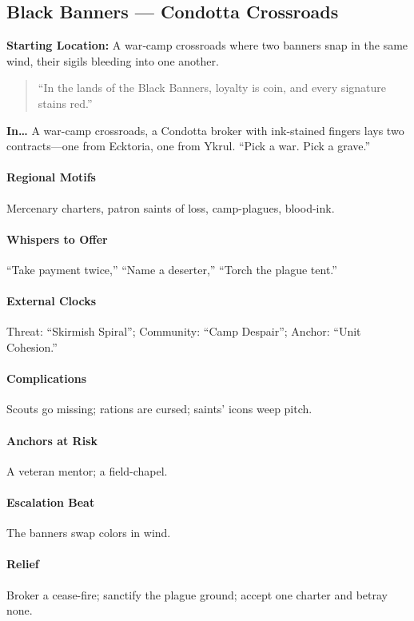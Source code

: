 \subsection*{Black Banners — Condotta Crossroads}
\textbf{Starting Location:} A war‑camp crossroads where two banners snap in the same wind, their sigils bleeding into one another.
\begin{quote}
“In the lands of the Black Banners, loyalty is coin, and every signature stains red.”
\end{quote}

\textbf{In…} A war-camp crossroads, a Condotta broker with ink-stained fingers lays two contracts—one from Ecktoria, one from Ykrul. ``Pick a war. Pick a grave.''
\paragraph{Regional Motifs} Mercenary charters, patron saints of loss, camp-plagues, blood-ink.
\paragraph{Whispers to Offer} ``Take payment twice,'' ``Name a deserter,'' ``Torch the plague tent.''
\paragraph{External Clocks} Threat: ``Skirmish Spiral''; Community: ``Camp Despair''; Anchor: ``Unit Cohesion.''
\paragraph{Complications} Scouts go missing; rations are cursed; saints’ icons weep pitch.
\paragraph{Anchors at Risk} A veteran mentor; a field-chapel.
\paragraph{Escalation Beat} The banners swap colors in wind.
\paragraph{Relief} Broker a cease-fire; sanctify the plague ground; accept one charter and betray none.


